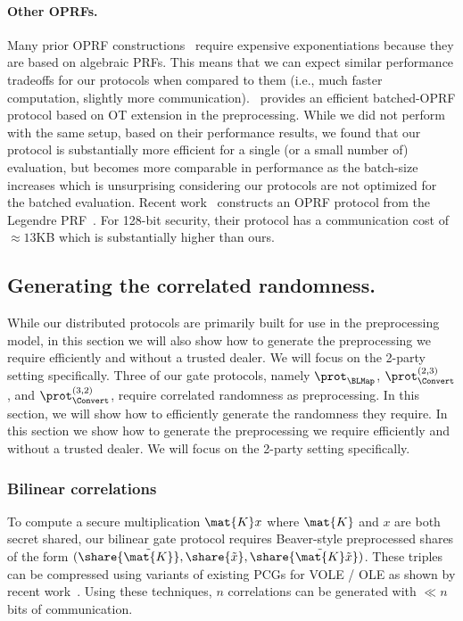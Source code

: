 \paragraph{Other OPRFs.}
Many prior OPRF constructions~\cite{freedman2005-oprf,jarecki2009-oprf} require expensive exponentiations because they are based on algebraic PRFs. This means that we can expect similar performance tradeoffs for our protocols when compared to them (i.e., much faster computation, slightly more communication).~\cite{kolesnikov2016-oprf} provides an efficient batched-OPRF protocol based on OT extension in the preprocessing. While we did not perform with the same setup, based on their performance results, we found that our protocol is substantially more efficient for a single (or a small number of) evaluation, but becomes more comparable in performance as the batch-size increases which is unsurprising considering our protocols are not optimized for the batched evaluation. Recent work~\cite{seres2021-legendre} constructs an OPRF protocol from the Legendre PRF~\cite{damgard1988-legendre}. For 128-bit security, their protocol has a communication cost of $\approx 13$KB which is substantially higher than ours.

\fi

\subsection{Generating the correlated randomness.}
\label{subsec:preprocessing}
\iffull
While our distributed protocols are primarily built for use in the preprocessing model, in this section we will also show how to generate the preprocessing we require efficiently and without a trusted dealer. We will focus on the 2-party setting specifically. Three of our gate protocols, namely $\prot_\BLMap$, $\prot_\Convert^{(2,3)}$, and $\prot_\Convert^{(3,2)}$, require correlated randomness as preprocessing. In this section, we will show how to efficiently generate the randomness they require.
\else
In this section we show how to generate the preprocessing we require efficiently and without a trusted dealer. We will focus on the 2-party setting specifically.
\fi

\iffull
\subsubsection{Bilinear correlations}
To compute a secure multiplication $\mat{K}x$ where $\mat{K}$ and $x$ are both secret shared, our bilinear gate protocol requires Beaver-style preprocessed shares of the form $(\share{\tilde{\mat{K}}}, \share{\tilde{x}}, \share{\tilde{\mat{K}}\tilde{x}})$. These triples can be compressed using variants of existing PCGs for VOLE / OLE as shown by recent work~\cite{boyle2019-pcg, boyle2020-lpn-pcg}. Using these techniques, $n$ correlations can be generated with $\ll n$ bits of communication.
\fi

